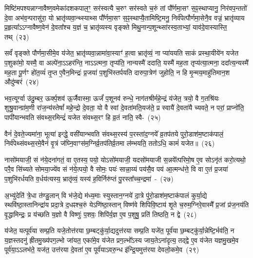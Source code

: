 मिष्टि॑मपश्यन्नाग्नावैष्ण॒वमेका॑\-दश\-कपाल॒ꣳ॒ सर॑स्वत्यै च॒रुꣳ सर॑स्वते च॒रुं तां पौ᳚र्णमा॒सꣳ स॒ꣴ॒स्थाप्यानु॒ निर॑वप॒न्ततो॑ दे॒वा अभ॑व॒न्परासु॑रा॒ यो भ्रातृ॑व्यवा॒न्थ्स्याथ्स पौ᳚र्णमा॒सꣳ स॒ꣴ॒स्थाप्यै॒तामिष्टि॒मनु॒ निर्व॑पेत्पौर्णमा॒सेनै॒व वज्रं॒ भ्रातृ॑व्याय प्र॒हृत्या᳚\-ऽऽ\-ग्नावैष्ण॒वेन॑ दे॒वता᳚श्च य॒ज्ञं च॒ भ्रातृ॑व्यस्य वृङ्क्ते मिथु॒नान्प॒शून्थ्सा॑\-रस्व॒ताभ्यां॒ याव॑दे॒वास्यास्ति॒ तथ्~(२३)

सर्वं॑ वृङ्क्ते पौर्णमा॒सीमे॒व य॑जेत॒ भ्रातृ॑व्यवा॒न्नामा॑वा॒स्याꣳ॑ ह॒त्वा भ्रातृ॑व्यं॒ ना प्या॑ययति साकं प्रस्था॒यीये॑न यजेत प॒शुका॑मो॒ यस्मै॒ वा अल्पे॑ना॒\-ऽऽ\-हर॑न्ति॒ ना\-ऽऽ\-त्मना॒ तृप्य॑ति॒ नान्यस्मै॑ ददाति॒ यस्मै॑ मह॒ता तृप्य॑त्या॒त्मना॒ ददा᳚त्य॒न्यस्मै॑ मह॒ता पू॒र्णꣳ हो॑त॒व्यं॑ तृ॒प्त ए॒वैन॒मिन्द्रः॑ प्र॒जया॑ प॒शुभि॑स्तर्पयति दारुपा॒त्रेण॑ जुहोति॒ न हि मृ॒न्मय॒माहु॑तिमान॒श औदु॑म्बरं~(२४)

भव॒त्यूर्ग्वा उ॑दु॒म्बर॒ ऊर्क्प॒शव॑ ऊ॒र्जैवास्मा॒ ऊर्जं॑ प॒शूनव॑ रुन्धे॒ नाग॑तश्रीर्महे॒न्द्रं य॑जेत॒ त्रयो॒ वै ग॒तश्रि॑यः शुश्रु॒वान्ग्रा॑म॒णी रा॑ज॒न्य॑स्तेषां᳚ महे॒न्द्रो दे॒वता॒ यो वै स्वां दे॒वता॑मति॒यज॑ते॒ प्र स्वायै॑ दे॒वता॑यै च्यवते॒ न परां॒ प्राप्नो॑ति॒ पापी॑यान्भवति संवथ्स॒रमिन्द्रं॑ यजेत संवथ्स॒रꣳ हि व्र॒तं नाति॒ स्वै-~(२५)

वैनं॑ दे॒वते॒ज्यमा॑ना॒ भूत्या॑ इन्द्धे॒ वसी॑यान्भवति संवथ्स॒रस्य॑ प॒रस्ता॑\-द॒ग्नये᳚ व्र॒तप॑तये पुरो॒डाश॑\-म॒ष्टा\-क॑पालं॒ निर्व॑पेथ्संवथ्स॒रमे॒वैनं॑ वृ॒त्रं ज॑घ्नि॒वाꣳस॑म॒ग्निर्व्र॒तप॑तिर्व्र॒तमा ल॑म्भयति॒ ततो\-ऽधि॒ कामं॑ यजेत॥~(२६)

{\anuvakamend[{ए॒तान्तदौदु॑म्बर॒ꣴ॒ स्वा त्रि॒ꣳ॒शच्च॑}]}%

नासो॑मयाजी॒ सं न॑ये॒दना॑गतं॒ वा ए॒तस्य॒ पयो॒ यो\-ऽसो॑मयाजी॒ यदसो॑मयाजी स॒न्नये᳚त्परिमो॒ष ए॒व सो\-ऽनृ॑तं करो॒त्यथो॒ परै॒व सि॑च्यते सोमया॒ज्ये॑व सं न॑ये॒त्पयो॒ वै सोमः॒ पयः॑ सान्ना॒य्यं पय॑सै॒व पय॑ आ॒त्मन्ध॑त्ते॒ वि वा ए॒तं प्र॒जया॑ प॒शुभि॑रर्धयति व॒र्धय॑त्यस्य॒ भ्रातृ॑व्यं॒ यस्य॑ ह॒विर्निरु॑प्तं पु॒रस्ता᳚च्च॒न्द्रमा॑~-~(२७)

अ॒भ्यु॑देति॑ त्रे॒धा त॑ण्डु॒लान् वि भ॑जे॒द्ये म॑ध्य॒माः स्युस्तान॒ग्नये॑ दा॒त्रे पु॑रो॒डाश॑म॒ष्टाक॑पालं कुर्या॒द्ये स्थवि॑ष्ठा॒स्तानिन्द्रा॑य प्रदा॒त्रे द॒धꣴश्च॒रुं ये\-ऽणि॑ष्ठा॒स्तान् विष्ण॑वे शिपिवि॒ष्टाय॑ शृ॒ते च॒रुम॒ग्निरे॒वास्मै᳚ प्र॒जां प्र॑ज॒नय॑ति वृ॒द्धामिन्द्रः॒ प्र य॑च्छति य॒ज्ञो वै विष्णुः॑ प॒शवः॒ शिपि॑र्य॒ज्ञ ए॒व प॒शुषु॒ प्रति॑ तिष्ठति॒ न द्वे~(२८)

य॑जेत॒ यत्पूर्व॑या सम्प्र॒ति यजे॒तोत्त॑रया छ॒म्बट्कु॑र्या॒द्यदुत्त॑रया सम्प्र॒ति यजे॑त॒ पूर्व॑या छ॒म्बट्कु॑र्या॒न्नेष्टि॒र्भव॑ति॒ न य॒ज्ञस्तदनु॑ ह्रीतमु॒ख्य॑पग॒ल्भो जा॑यत॒ एका॑मे॒व य॑जेत प्रग॒ल्भो᳚\-ऽस्य जाय॒ते\-ऽना॑दृत्य॒ तद्द्वे ए॒व य॑जेत यज्ञमु॒खमे॒व पूर्व॑या॒\-ऽऽ\-लभ॑ते॒ यज॑त॒ उत्त॑रया दे॒वता॑ ए॒व पूर्व॑या\-ऽवरु॒न्ध इ॑न्द्रि॒यमुत्त॑रया देवलो॒कमे॒व~(२९)

